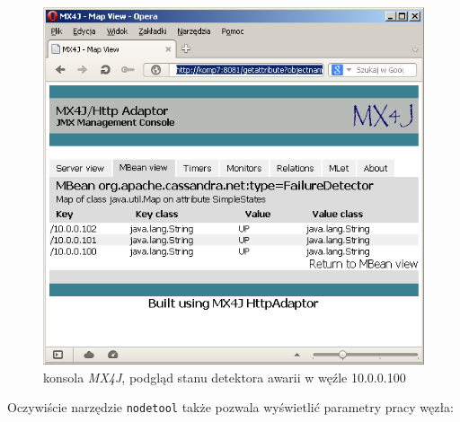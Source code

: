 \documentclass{article} %
\begin{document}
\begin{figure}[h]
\centering
\includegraphics[width=0.8\linewidth]{gfx/mx4j-fd}
\caption{konsola \emph{MX4J}, podgląd stanu detektora awarii w węźle 10.0.0.100}
\label{fig:mx4j}
\end{figure}

\pagebreak

\noindent Oczywiście narzędzie \texttt{nodetool} także pozwala wyświetlić parametry pracy węzła:
\end{document}
